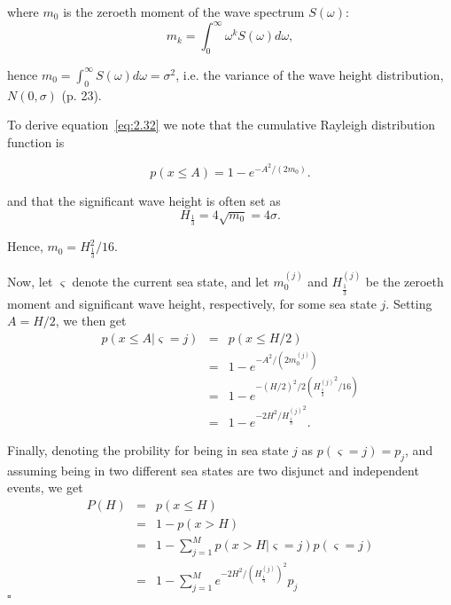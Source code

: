 \documentclass{article}
\newcommand{\Hs}{H_{\frac{1}{3}}}
\newcommand{\Hsj}{\Hs^{(j)}}
\newcommand{\mZeroj}{m_0^{(j)}}
\begin{document}
\noindent
where $m_0$ is the zeroeth moment of the wave spectrum $S(\omega)$:
\begin{equation}
  \label{eq:2.23below}
  m_k = \int_0^\infty \omega^k S(\omega) d\omega,
\end{equation}

\noindent
hence $m_0 = \int_0^\infty S(\omega) d\omega = \sigma^2$, i.e. the
variance of the wave height distribution, $N(0, \sigma)$ (p. 23).

To derive equation~\ref{eq:2.32} we note that the cumulative Rayleigh
distribution function is

\begin{equation}
  \label{eq:rayleighCumulative}
  p(x \leq A) = 1 - e^{-A^2/(2m_0)}.
\end{equation}

\noindent
and that the significant wave height is often set as
\begin{equation}
  \label{eq:significantWaweHeight}
  \Hs = 4\sqrt{m_0} = 4\sigma.
\end{equation}

\noindent
Hence, $m_0 = \Hs^2/16$.

Now, let $\varsigma$ denote the current sea state, and let $\mZeroj$ and
$\Hsj$ be the zeroeth moment and significant wave height,
respectively, for some sea state $j$. Setting $A = H/2$, we then get
\begin{eqnarray*}
  p(x \leq A | \varsigma = j)
  &=& p(x \leq H/2) \\
  &=& 1 - e^{-A^2/(2\mZeroj)} \\
  &=& 1 - e^{-(H/2)^{2} / 2({\Hsj}^2/16)} \\
  &=& 1 - e^{-2H^2/{\Hsj}^2}.
\end{eqnarray*}

\noindent
Finally, denoting the probility for being in sea state $j$ as
$p(\varsigma = j) = p_j$, and assuming being in two different sea
states are two disjunct and independent events, we get
\begin{eqnarray*}
  P(H)
  &=& p(x \leq H) \\
  &=& 1 - p(x > H) \\
  &=& 1 - \sum\limits_{j = 1}^M p(x > H | \varsigma = j)p(\varsigma = j) \\
  &=& 1 - \sum\limits_{j = 1}^M e^{-2H^2/(\Hsj)^2}p_j
\end{eqnarray*}
\noindent $\square$

{}

\end{document}
